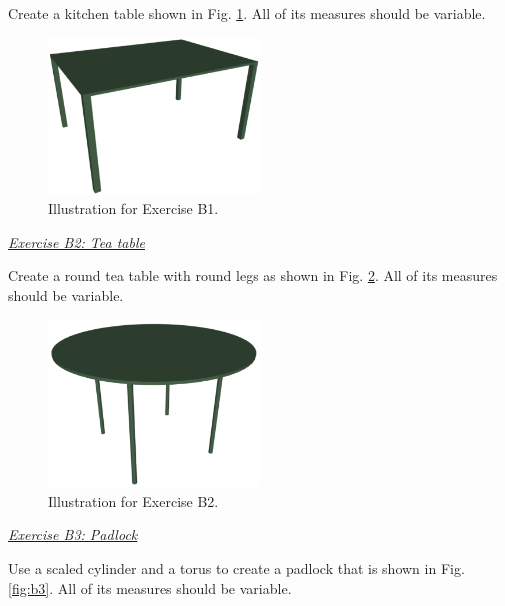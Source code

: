 \documentclass[article,A4,12pt]{llncs}
\begin{document}
Create a kitchen table shown in Fig. \ref{fig:b1}. All of its measures should be variable.

\newpage

\begin{figure}[!ht]
\begin{center}
\includegraphics[width=0.5\textwidth]{img/kitchentable.png}
\end{center}
\vspace{-2mm}
\caption{Illustration for Exercise B1.}
\label{fig:b1}
\end{figure}
\noindent
\underline{\em Exercise B2: Tea table}

Create a round tea table with round legs as
shown in Fig. \ref{fig:b2}. All of its measures should be variable.

\begin{figure}[!ht]
\begin{center}
\includegraphics[width=0.5\textwidth]{img/teatable.png}
\end{center}
\vspace{-2mm}
\caption{Illustration for Exercise B2.}
\label{fig:b2}
\end{figure}
\noindent
\underline{\em Exercise B3: Padlock}

Use a scaled cylinder and a torus to create a padlock that is shown in Fig. \ref{fig:b3}. 
All of its measures should be variable.
\end{document}
